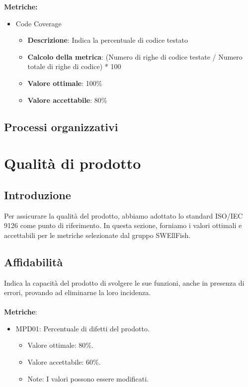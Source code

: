 \documentclass[12pt]{article}
\begin{document}
\textbf{Metriche:}
\begin{itemize}
	\item Code Coverage
	      \begin{itemize}
		      \item \textbf{Descrizione}: Indica la percentuale di codice testato
		      \item \textbf{Calcolo della metrica}:  (Numero di righe di codice testate / Numero totale di righe di codice) * 100
		      \item \textbf{Valore ottimale}: 100\%
		      \item \textbf{Valore accettabile}: 80\%
	      \end{itemize}
\end{itemize}

\subsection{Processi organizzativi}

\section{Qualità di prodotto}
\subsection{Introduzione}
Per assicurare la qualità del prodotto, abbiamo adottato lo standard ISO/IEC 9126 come punto di riferimento. In questa sezione, forniamo i valori ottimali e accettabili per le metriche selezionate dal gruppo SWEllFish.



\subsection{Affidabilità}
	Indica la capacità del prodotto di svolgere le sue funzioni, anche in presenza di errori, provando ad eliminarne la loro incidenza.
	\\\\
	\textbf{Metriche}:
	\begin{itemize}
		\item MPD01: Percentuale di difetti del prodotto.
		\begin{itemize}	
			\item Valore ottimale: 80\%.
			\item Valore accettabile: 60\%.
			\item Note: I valori possono essere modificati.
		\end{itemize}
	\end{itemize}
\end{document}
